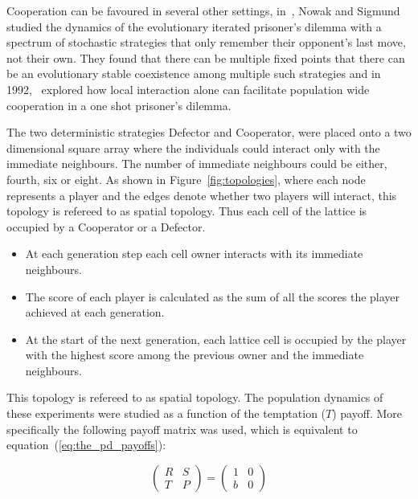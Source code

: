 \documentclass{article}
\theoremstyle{definition}
\begin{document}
Cooperation can be favoured in several other settings, in~\cite{nowak1989},
Nowak and Sigmund studied the dynamics of the evolutionary
iterated prisoner's dilemma with a spectrum of stochastic strategies that only
remember their opponent's last move, not their own. They found that there can be
multiple fixed points that there can be an evolutionary stable coexistence among
multiple such strategies and in  1992,~\cite{Nowak1992b} explored how local
interaction alone can facilitate population wide
cooperation in a one shot prisoner's dilemma.

The two deterministic strategies Defector and Cooperator, were placed onto a two
dimensional square array where the individuals could interact only with the immediate
neighbours. The number of immediate neighbours could be either, fourth, six or eight.
As shown in Figure~\ref{fig:topologies}, where each node represents a player and
the edges denote whether two players will interact, this topology is refereed to
as spatial topology. Thus each cell of the lattice is occupied by a Cooperator
or a Defector.

\begin{itemize}
    \item At each generation step each cell owner interacts with its immediate neighbours.
    \item The score of each player is calculated as the sum of all the scores the player
    achieved at each generation.
    \item At the start of the next generation, each lattice
    cell is occupied by the player with the highest score among the previous owner
    and the immediate neighbours.
\end{itemize}

This topology is refereed to as spatial topology. The population dynamics of these
experiments were studied as a function of the temptation (\(T\)) payoff.
More specifically the following payoff matrix was used, which is equivalent
to equation~(\ref{eq:the_pd_payoffs}):

\begin{equation}
    \begin{pmatrix}
    R & S \\ T & P
    \end{pmatrix}
    =
    \begin{pmatrix}
        1 & 0 \\ b & 0
    \end{pmatrix}
\end{equation}
\end{document}
